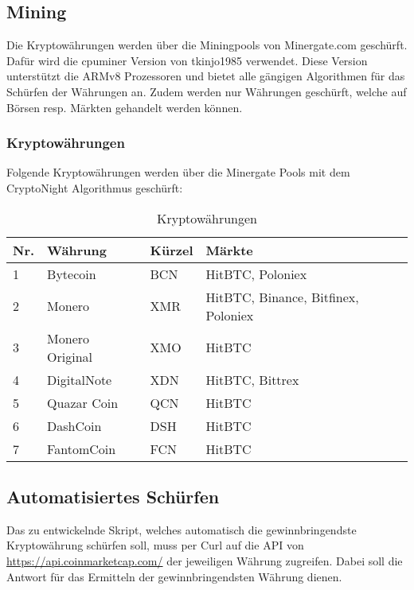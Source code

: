 \subsection{Mining}
Die Kryptowährungen werden über die Miningpools von Minergate.com geschürft. Dafür wird die cpuminer Version von tkinjo1985 verwendet. Diese Version unterstützt die ARMv8 Prozessoren und bietet alle gängigen Algorithmen für das Schürfen der Währungen an.
Zudem werden nur Währungen geschürft, welche auf Börsen resp. Märkten gehandelt werden können.


\subsubsection{Kryptowährungen}
Folgende Kryptowährungen werden über die Minergate Pools mit dem CryptoNight Algorithmus geschürft:

\begin{table}[H]
\centering
\begin{tabular}{p{1cm}p{3.5cm}p{2cm}p{9.5cm}}
\hline
\rowcolor{heading} \textbf{Nr.} & \textbf{Währung} & \textbf{Kürzel} &\textbf{Märkte } \\\hline
1 & Bytecoin & BCN & HitBTC, Poloniex \\\hline
2 & Monero & XMR & HitBTC, Binance, Bitfinex, Poloniex \\\hline
3 & Monero Original & XMO & HitBTC \\\hline
4 & DigitalNote & XDN & HitBTC, Bittrex \\\hline
5 & Quazar Coin & QCN & HitBTC \\\hline
6 & DashCoin & DSH & HitBTC \\\hline
7 & FantomCoin & FCN & HitBTC \\\hline
\end{tabular}
\caption{Kryptowährungen}
\end{table}


\subsection{Automatisiertes Schürfen}
Das zu entwickelnde Skript, welches automatisch die gewinnbringendste Kryptowährung schürfen soll, muss per Curl auf  die API von \url{https://api.coinmarketcap.com/} der jeweiligen Währung zugreifen. Dabei soll die Antwort für das Ermitteln der gewinnbringendsten Währung dienen.